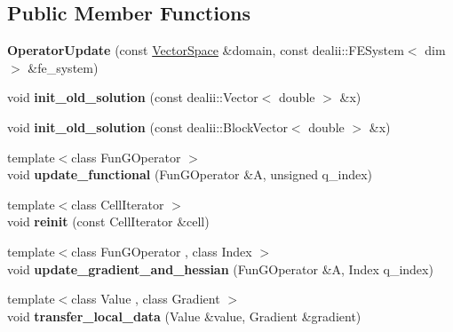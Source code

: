 \subsection*{Public Member Functions}
\begin{DoxyCompactItemize}
\item 
\hypertarget{structSpacy_1_1dealII_1_1Detail_1_1OperatorUpdate_a86e26a8d18f90341ca1f4d8e8575b7ca}{{\bfseries Operator\-Update} (const \hyperlink{classSpacy_1_1VectorSpace}{Vector\-Space} \&domain, const dealii\-::\-F\-E\-System$<$ dim $>$ \&fe\-\_\-system)}\label{structSpacy_1_1dealII_1_1Detail_1_1OperatorUpdate_a86e26a8d18f90341ca1f4d8e8575b7ca}

\item 
\hypertarget{structSpacy_1_1dealII_1_1Detail_1_1OperatorUpdate_afe0417057101640cf710d37af51919c1}{void {\bfseries init\-\_\-old\-\_\-solution} (const dealii\-::\-Vector$<$ double $>$ \&x)}\label{structSpacy_1_1dealII_1_1Detail_1_1OperatorUpdate_afe0417057101640cf710d37af51919c1}

\item 
\hypertarget{structSpacy_1_1dealII_1_1Detail_1_1OperatorUpdate_afb99cae3d19ffbe116d6e5870c158526}{void {\bfseries init\-\_\-old\-\_\-solution} (const dealii\-::\-Block\-Vector$<$ double $>$ \&x)}\label{structSpacy_1_1dealII_1_1Detail_1_1OperatorUpdate_afb99cae3d19ffbe116d6e5870c158526}

\item 
\hypertarget{structSpacy_1_1dealII_1_1Detail_1_1OperatorUpdate_a2874e188ef84099a662b61085a20ade4}{{\footnotesize template$<$class Fun\-G\-Operator $>$ }\\void {\bfseries update\-\_\-functional} (Fun\-G\-Operator \&A, unsigned q\-\_\-index)}\label{structSpacy_1_1dealII_1_1Detail_1_1OperatorUpdate_a2874e188ef84099a662b61085a20ade4}

\item 
\hypertarget{structSpacy_1_1dealII_1_1Detail_1_1OperatorUpdate_a1c4d36e22b606f7e74202ad052c9d2bb}{{\footnotesize template$<$class Cell\-Iterator $>$ }\\void {\bfseries reinit} (const Cell\-Iterator \&cell)}\label{structSpacy_1_1dealII_1_1Detail_1_1OperatorUpdate_a1c4d36e22b606f7e74202ad052c9d2bb}

\item 
\hypertarget{structSpacy_1_1dealII_1_1Detail_1_1OperatorUpdate_aada286dd436187271f832d8a771fba83}{{\footnotesize template$<$class Fun\-G\-Operator , class Index $>$ }\\void {\bfseries update\-\_\-gradient\-\_\-and\-\_\-hessian} (Fun\-G\-Operator \&A, Index q\-\_\-index)}\label{structSpacy_1_1dealII_1_1Detail_1_1OperatorUpdate_aada286dd436187271f832d8a771fba83}

\item 
\hypertarget{structSpacy_1_1dealII_1_1Detail_1_1OperatorUpdate_a4bc296edc42dff189df642b574df28c0}{{\footnotesize template$<$class Value , class Gradient $>$ }\\void {\bfseries transfer\-\_\-local\-\_\-data} (Value \&value, Gradient \&gradient)}\label{structSpacy_1_1dealII_1_1Detail_1_1OperatorUpdate_a4bc296edc42dff189df642b574df28c0}

\end{DoxyCompactItemize}
